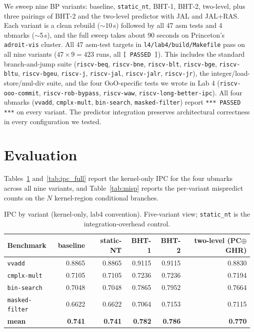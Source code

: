 \documentclass[10pt]{article}
\begin{document}
We sweep nine BP variants: baseline, \texttt{static\_nt}, BHT-1,
BHT-2, two-level, plus three pairings of BHT-2 and the two-level
predictor with JAL and JAL+RAS. Each variant is a clean rebuild
($\sim$10\,s) followed by all 47 asm tests and 4 ubmarks
($\sim$5\,s), and the full sweep takes about 90 seconds on
Princeton's \texttt{adroit-vis} cluster. All 47 asm-test targets in
\texttt{l4/lab4/build/Makefile} pass on all nine variants
($47 \times 9 = 423$ runs, all \texttt{[ PASSED ]}). This includes
the standard branch-and-jump suite (\texttt{riscv-beq},
\texttt{riscv-bne}, \texttt{riscv-blt}, \texttt{riscv-bge},
\texttt{riscv-bltu}, \texttt{riscv-bgeu}, \texttt{riscv-j},
\texttt{riscv-jal}, \texttt{riscv-jalr}, \texttt{riscv-jr}), the
integer/load-store/mul-div suite, and the four OoO-specific tests we
wrote in Lab 4 (\texttt{riscv-ooo-commit}, \texttt{riscv-rob-bypass},
\texttt{riscv-waw}, \texttt{riscv-long-better-ipc}). All four ubmarks
(\texttt{vvadd}, \texttt{cmplx-mult}, \texttt{bin-search},
\texttt{masked-filter}) report \texttt{*** PASSED ***} on every
variant. The predictor integration preserves architectural
correctness in every configuration we tested.

\section{Evaluation}

Tables~\ref{tab:ipc_main} and~\ref{tab:ipc_full} report the
kernel-only IPC for the four ubmarks across all nine variants, and
Table~\ref{tab:misp} reports the per-variant mispredict counts on the
$N$ kernel-region conditional branches.

\begin{table}[h]
\centering
\caption{IPC by variant (kernel-only, lab4 convention). Five-variant
view; \texttt{static\_nt} is the integration-overhead control.}
\label{tab:ipc_main}
\begin{tabular}{lrrrrr}
\toprule
Benchmark & baseline & static-NT & BHT-1 & BHT-2 & two-level (PC$\oplus$GHR) \\
\midrule
\texttt{vvadd}        & 0.8865 & 0.8865 & 0.9115 & 0.9115 & 0.8830 \\
\texttt{cmplx-mult}   & 0.7105 & 0.7105 & 0.7236 & 0.7236 & 0.7194 \\
\texttt{bin-search}   & 0.7048 & 0.7048 & 0.7865 & 0.7952 & 0.7664 \\
\texttt{masked-filter}& 0.6622 & 0.6622 & 0.7064 & 0.7153 & 0.7115 \\
\midrule
\textbf{mean}         & \textbf{0.741} & \textbf{0.741} & \textbf{0.782} & \textbf{0.786} & \textbf{0.770} \\
\bottomrule
\end{tabular}
\end{table}
\end{document}

